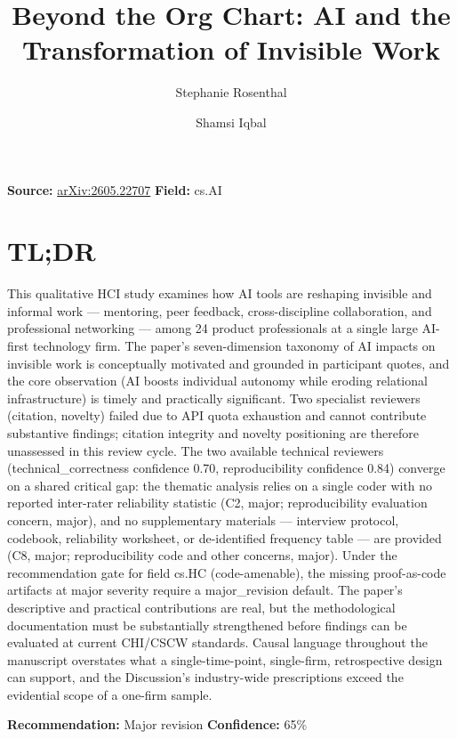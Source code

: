 \documentclass[11pt]{article}
\title{Beyond the Org Chart: AI and the Transformation of Invisible Work}
\author{Stephanie Rosenthal \and Shamsi Iqbal}
\date{}
\begin{document}
\maketitle

\noindent\textbf{Source:} \href{https://arxiv.org/abs/2605.22707}{arXiv:2605.22707} \quad \textbf{Field:} cs.AI\\

\section*{TL;DR}
This qualitative HCI study examines how AI tools are reshaping invisible and informal work — mentoring, peer feedback, cross-discipline collaboration, and professional networking — among 24 product professionals at a single large AI-first technology firm. The paper's seven-dimension taxonomy of AI impacts on invisible work is conceptually motivated and grounded in participant quotes, and the core observation (AI boosts individual autonomy while eroding relational infrastructure) is timely and practically significant. Two specialist reviewers (citation, novelty) failed due to API quota exhaustion and cannot contribute substantive findings; citation integrity and novelty positioning are therefore unassessed in this review cycle. The two available technical reviewers (technical\_correctness confidence 0.70, reproducibility confidence 0.84) converge on a shared critical gap: the thematic analysis relies on a single coder with no reported inter-rater reliability statistic (C2, major; reproducibility evaluation concern, major), and no supplementary materials — interview protocol, codebook, reliability worksheet, or de-identified frequency table — are provided (C8, major; reproducibility code and other concerns, major). Under the recommendation gate for field cs.HC (code-amenable), the missing proof-as-code artifacts at major severity require a major\_revision default. The paper's descriptive and practical contributions are real, but the methodological documentation must be substantially strengthened before findings can be evaluated at current CHI/CSCW standards. Causal language throughout the manuscript overstates what a single-time-point, single-firm, retrospective design can support, and the Discussion's industry-wide prescriptions exceed the evidential scope of a one-firm sample.

\textbf{Recommendation:} Major revision \quad \textbf{Confidence:} 65\%\\
\end{document}
